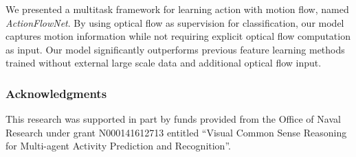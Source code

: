\documentclass[10pt,twocolumn,letterpaper]{article}
\begin{document}
We presented a multitask framework for learning action with motion flow, named \emph{ActionFlowNet}. 
By using optical flow as supervision for classification, our model captures motion information while not requiring explicit optical flow computation as input.
Our model significantly outperforms previous feature learning methods trained without external large scale data and additional optical flow input.

\subsubsection*{Acknowledgments}
This research was supported in part by funds provided from
the Office of Naval Research under grant N000141612713
entitled ``Visual Common Sense Reasoning for Multi-agent
Activity Prediction and Recognition''.


{\small


}
\end{document}
